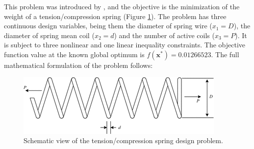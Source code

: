 


This problem was introduced by \cite{TC}, and the objective is the minimization of the weight of a tension/compression spring (Figure \ref{fig:TC}). The problem has three continuous design variables, being them the diameter of spring wire ($x_1 = D$), the diameter of spring mean coil ($x_2 = d$) and the number of active coils ($x_3 = P$). It is subject to three nonlinear and one linear inequality constraints. The objective function value at the known global optimum is $f(\bm{x}^*) = 0.01266523$. The full mathematical formulation of the problem follows:

\vspace{-0.5cm}



\vspace{0.5cm}


\begin{figure}[h]
\begin{center}
\includegraphics[scale=0.6]{Imgs/TC.png}
\end{center}
\captionsetup{justification=centering}
\caption{Schematic view of the tension/compression spring design problem.}\label{fig:TC}
\end{figure}
